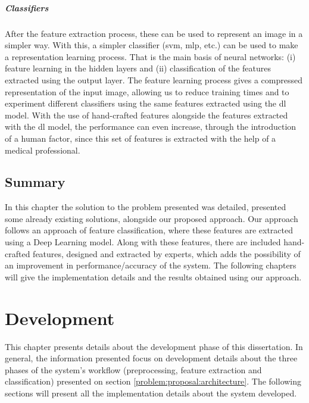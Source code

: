 \documentclass[
  twoside,
  11pt, a4paper,
  footinclude=true,
  headinclude=true,
  cleardoublepage=empty
]{scrbook}
\begin{document}
        \paragraph{Classifiers}
          After the feature extraction process, these can be used to represent an image in a simpler way. With this, a simpler classifier (\gls{svm}, \gls{mlp}, etc.) can be used to make a representation learning process. That is the main basis of neural networks: (i) feature learning in the hidden layers and (ii) classification of the features extracted using the output layer. The feature learning process gives a compressed representation of the input image, allowing us to reduce training times and to experiment different classifiers using the same features extracted using the \gls{dl} model. With the use of hand-crafted features alongside the features extracted with the \gls{dl} model, the performance can even increase, through the introduction of a human factor, since this set of features is extracted with the help of a medical professional.

    \section{Summary} \label{problem:summary}
      In this chapter the solution to the problem presented was detailed, presented some already existing solutions, alongside our proposed approach. Our approach follows an approach of feature classification, where these features are extracted using a Deep Learning model. Along with these features, there are included hand-crafted features, designed and extracted by experts, which adds the possibility of an improvement in performance/accuracy of the system. The following chapters will give the implementation details and the results obtained using our approach.

  \chapter{Development} \label{development}
    This chapter presents details about the development phase of this dissertation. In general, the information presented focus on development details about the three phases of the system's workflow (preprocessing, feature extraction and classification) presented on section \ref{problem:proposal:architecture}. The following sections will present all the implementation details about the system developed.
\end{document}
